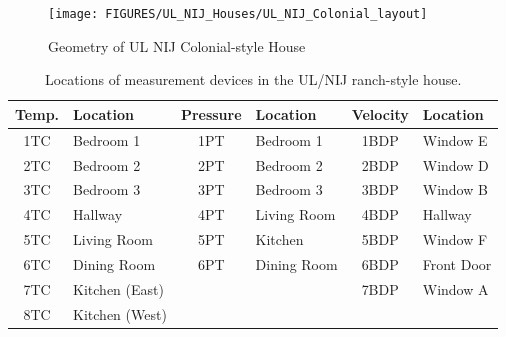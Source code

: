\begin{figure}[p]
\texttt{[image: FIGURES/UL\_NIJ\_Houses/UL\_NIJ\_Colonial\_layout]}
\caption{Geometry of UL NIJ Colonial-style House}
\label{Colonial_layout}
\end{figure}

\begin{table}[ht!]
\begin{center}
\begin{tabular}{|c|l||c|l||c|l|}
\hline
Temp.           	& Location 			& Pressure          	& Location 		& Velocity              & Location 	\\ \hline \hline
1TC  				& Bedroom 1 		& 1PT 					& Bedroom 1 	& 1BDP 					& Window E 	\\ \hline
2TC  				& Bedroom 2 		& 2PT 					& Bedroom 2 	& 2BDP 					& Window D 	\\ \hline
3TC  				& Bedroom 3 		& 3PT 					& Bedroom 3 	& 3BDP 					& Window B 	\\ \hline
4TC  				& Hallway 			& 4PT 					& Living Room 	& 4BDP 					& Hallway 	\\ \hline
5TC  				& Living Room 		& 5PT 					& Kitchen 		& 5BDP 					& Window F 	\\ \hline
6TC  				& Dining Room 		& 6PT 					& Dining Room 	& 6BDP 					& Front Door\\ \hline
7TC  				& Kitchen (East) 	& \multicolumn{2}{r||}{}				& 7BDP 					& Window A 	\\ \cline{1-2} \cline{5-6}
8TC  				& Kitchen (West) 	& \multicolumn{2}{r}{}					& \multicolumn{2}{r|}{}  			\\ \hline
\end{tabular}
\end{center}
\caption[Locations of measurement devices in the UL/NIJ ranch-style house]
{Locations of measurement devices in the UL/NIJ ranch-style house.}
\label{Ranch_devices}
\end{table}

